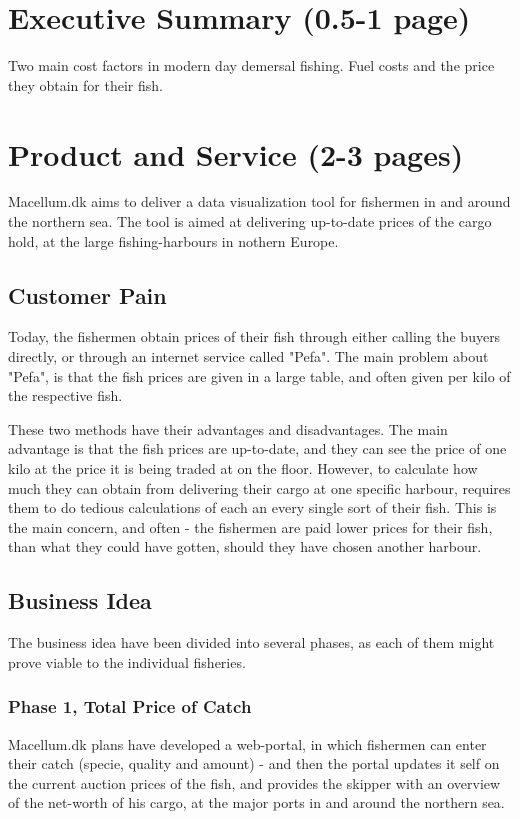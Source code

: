 \documentclass[a4paper,10pt,dateno,oneside,fleqn,sigleft]{newlfm} %
\begin{document}
\begin{newlfm}


\section{Executive Summary (0.5-1 page)}
Two main cost factors in modern day demersal fishing. Fuel costs and the price they obtain for their fish.

\section{Product and Service (2-3 pages)}
Macellum.dk aims to deliver a data visualization tool for fishermen in and around the northern sea. The tool is aimed at delivering up-to-date prices of the cargo hold, at the large fishing-harbours in nothern Europe. 

\subsection{Customer Pain}
Today, the fishermen obtain prices of their fish through either calling the buyers directly, or through an internet service called "Pefa". The main problem about "Pefa", is that the fish prices are given in a large table, and often given per kilo of the respective fish. 

These two methods have their advantages and disadvantages. The main advantage is that the fish prices are up-to-date, and they can see the price of one kilo at the price it is being traded at on the floor. However, to calculate how much they can obtain from delivering their cargo at one specific harbour, requires them to do tedious calculations of each an every single sort of their fish. This is the main concern, and often - the fishermen are paid lower prices for their fish, than what they could have gotten, should they have chosen another harbour. 

\subsection{Business Idea}
The business idea have been divided into several phases, as each of them might prove viable to the individual fisheries.

\subsubsection{Phase 1, Total Price of Catch}
Macellum.dk plans have developed a web-portal, in which fishermen can enter their catch (specie, quality and amount) - and then the portal updates it self on the current auction prices of the fish, and provides the skipper with an overview of the net-worth of his cargo, at the major ports in and around the northern sea. 


\end{newlfm}
\end{document}

